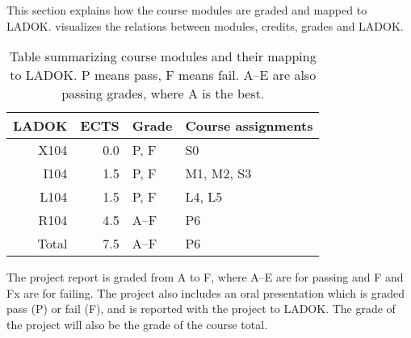 This section explains how the course modules are graded and mapped to LADOK\@.
 visualizes the relations between modules, credits, grades and 
LADOK\@.

\begin{table}
  \centering
  \setlength{\tabcolsep}{0.5em}
  \begin{tabular}{r r l l}
    \toprule
    LADOK & ECTS  & Grade       & Course assignments\\
    \midrule
    X104  & 0.0   & P, F        & S0\\
    I104  & 1.5   & P, F        & M1, M2, S3\\
    L104  & 1.5   & P, F        & L4, L5\\
    R104  & 4.5   & A--F        & P6\\
    \midrule
    Total & 7.5   & A--F        & P6\\
    \bottomrule
  \end{tabular}
  \caption{%
    Table summarizing course modules and their mapping to LADOK\@.
    P means pass, F means fail.
    A--E are also passing grades, where A is the best.
  }\label{LADOKTable}
\end{table}

The project report is graded from A to F, where A--E are for passing and F and 
Fx are for failing.
The project also includes an oral presentation which is graded pass (P) or fail 
(F), and is reported with the project to LADOK\@.
The grade of the project will also be the grade of the course total.

